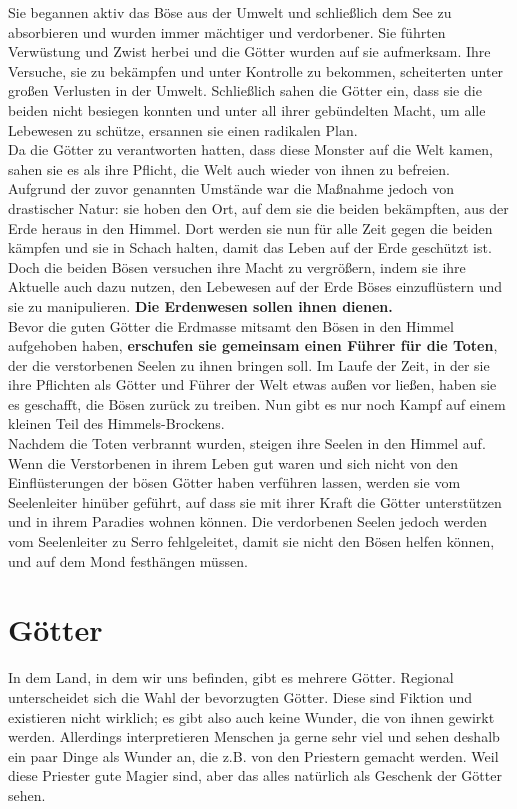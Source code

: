 Sie begannen aktiv das Böse aus der Umwelt und schließlich dem See zu absorbieren und wurden immer mächtiger und verdorbener. 
Sie führten Verwüstung und Zwist herbei und die Götter wurden auf sie aufmerksam. 
Ihre Versuche, sie zu bekämpfen und unter Kontrolle zu bekommen, scheiterten unter großen Verlusten in der Umwelt. 
Schließlich sahen die Götter ein, dass sie die beiden nicht besiegen konnten und unter all ihrer gebündelten Macht, um alle Lebewesen zu schütze, ersannen sie einen radikalen Plan.\\
Da die Götter zu verantworten hatten, dass diese Monster auf die Welt kamen, sahen sie es als ihre Pflicht, die Welt auch wieder von ihnen zu befreien. 
Aufgrund der zuvor genannten Umstände war die Maßnahme jedoch von drastischer Natur: sie hoben den Ort, auf dem sie die beiden bekämpften, aus der Erde heraus in den Himmel. 
Dort werden sie nun für alle Zeit gegen die beiden kämpfen und sie in Schach halten, damit das Leben auf der Erde geschützt ist.\\
Doch die beiden Bösen versuchen ihre Macht zu vergrößern, indem sie ihre Aktuelle auch dazu nutzen, den Lebewesen auf der Erde Böses einzuflüstern und sie zu manipulieren. 
\textbf{Die Erdenwesen sollen ihnen dienen.}\\
Bevor die guten Götter die Erdmasse mitsamt den Bösen in den Himmel aufgehoben haben, \textbf{erschufen sie gemeinsam einen Führer für die Toten}, der die verstorbenen Seelen zu ihnen bringen soll. 
Im Laufe der Zeit, in der sie ihre Pflichten als Götter und Führer der Welt etwas außen vor ließen, haben sie es geschafft, die Bösen zurück zu treiben. 
Nun gibt es nur noch Kampf auf einem kleinen Teil des Himmels-Brockens.\\
Nachdem die Toten verbrannt wurden, steigen ihre Seelen in den Himmel auf.
Wenn die Verstorbenen in ihrem Leben gut waren und sich nicht von den Einflüsterungen der bösen Götter haben verführen lassen, werden sie vom Seelenleiter hinüber geführt, auf dass sie mit ihrer Kraft die Götter unterstützen und in ihrem Paradies wohnen können. 
Die verdorbenen Seelen jedoch werden vom Seelenleiter zu Serro fehlgeleitet, damit sie nicht den Bösen helfen können, und auf dem Mond festhängen müssen.

\section{Götter}
In dem Land, in dem wir uns befinden, gibt es mehrere Götter. 
Regional unterscheidet sich die Wahl der bevorzugten Götter.
Diese sind Fiktion und existieren nicht wirklich; es gibt also auch keine Wunder, die von ihnen gewirkt werden. 
Allerdings interpretieren Menschen ja gerne sehr viel und sehen deshalb ein paar Dinge als Wunder an, die z.B. von den Priestern gemacht werden. 
Weil diese Priester gute Magier sind, aber das alles natürlich als Geschenk der Götter sehen.\\

